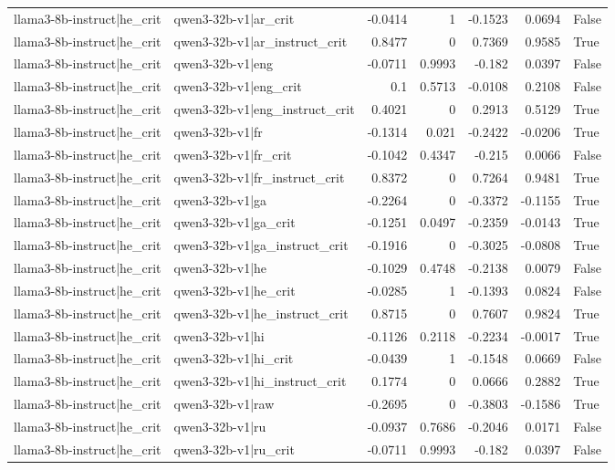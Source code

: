 \begin{table}
\begin{tabular}{l l r r r r l}
llama3-8b-instruct|he_crit & qwen3-32b-v1|ar_crit & -0.0414 & 1 & -0.1523 & 0.0694 & False \\
llama3-8b-instruct|he_crit & qwen3-32b-v1|ar_instruct_crit & 0.8477 & 0 & 0.7369 & 0.9585 & True \\
llama3-8b-instruct|he_crit & qwen3-32b-v1|eng & -0.0711 & 0.9993 & -0.182 & 0.0397 & False \\
llama3-8b-instruct|he_crit & qwen3-32b-v1|eng_crit & 0.1 & 0.5713 & -0.0108 & 0.2108 & False \\
llama3-8b-instruct|he_crit & qwen3-32b-v1|eng_instruct_crit & 0.4021 & 0 & 0.2913 & 0.5129 & True \\
llama3-8b-instruct|he_crit & qwen3-32b-v1|fr & -0.1314 & 0.021 & -0.2422 & -0.0206 & True \\
llama3-8b-instruct|he_crit & qwen3-32b-v1|fr_crit & -0.1042 & 0.4347 & -0.215 & 0.0066 & False \\
llama3-8b-instruct|he_crit & qwen3-32b-v1|fr_instruct_crit & 0.8372 & 0 & 0.7264 & 0.9481 & True \\
llama3-8b-instruct|he_crit & qwen3-32b-v1|ga & -0.2264 & 0 & -0.3372 & -0.1155 & True \\
llama3-8b-instruct|he_crit & qwen3-32b-v1|ga_crit & -0.1251 & 0.0497 & -0.2359 & -0.0143 & True \\
llama3-8b-instruct|he_crit & qwen3-32b-v1|ga_instruct_crit & -0.1916 & 0 & -0.3025 & -0.0808 & True \\
llama3-8b-instruct|he_crit & qwen3-32b-v1|he & -0.1029 & 0.4748 & -0.2138 & 0.0079 & False \\
llama3-8b-instruct|he_crit & qwen3-32b-v1|he_crit & -0.0285 & 1 & -0.1393 & 0.0824 & False \\
llama3-8b-instruct|he_crit & qwen3-32b-v1|he_instruct_crit & 0.8715 & 0 & 0.7607 & 0.9824 & True \\
llama3-8b-instruct|he_crit & qwen3-32b-v1|hi & -0.1126 & 0.2118 & -0.2234 & -0.0017 & True \\
llama3-8b-instruct|he_crit & qwen3-32b-v1|hi_crit & -0.0439 & 1 & -0.1548 & 0.0669 & False \\
llama3-8b-instruct|he_crit & qwen3-32b-v1|hi_instruct_crit & 0.1774 & 0 & 0.0666 & 0.2882 & True \\
llama3-8b-instruct|he_crit & qwen3-32b-v1|raw & -0.2695 & 0 & -0.3803 & -0.1586 & True \\
llama3-8b-instruct|he_crit & qwen3-32b-v1|ru & -0.0937 & 0.7686 & -0.2046 & 0.0171 & False \\
llama3-8b-instruct|he_crit & qwen3-32b-v1|ru_crit & -0.0711 & 0.9993 & -0.182 & 0.0397 & False \\

\end{tabular}
\end{table}

